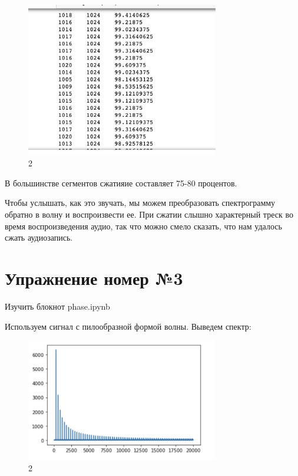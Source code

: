 \documentclass[10pt,a4paper,oneside]{article}
\begin{document}
\begin{figure}[H]
        \centering
        \includegraphics[width=0.75\textwidth]{pics/11.png}
        \caption{2}
        \label{fig:first}
\end{figure}

В большинстве сегментов сжатияие составляет 75-80 процентов.

Чтобы услышать, как это звучать, мы можем преобразовать спектрограмму обратно в волну и воспроизвести ее. При сжатии слышно характерный треск во время воспроизведения аудио, так что можно смело сказать, что нам удалось сжать аудиозапись.

\section{Упражнение номер №3}

Изучить блокнот phase.ipynb

Используем сигнал с пилообразной формой волны. Выведем спектр: 

\begin{figure}[H]
        \centering
        \includegraphics[width=0.75\textwidth]{pics/12.png}
        \caption{2}
        \label{fig:first}
\end{figure}
\end{document}
